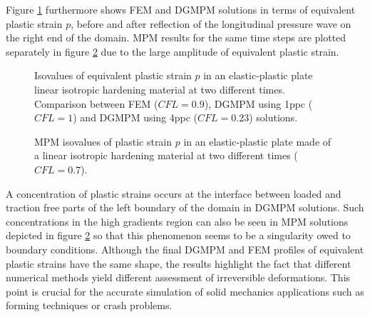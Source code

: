 Figure \ref{fig:2dEP_comparison} furthermore shows FEM and DGMPM solutions in terms of equivalent plastic strain $p$, before and after reflection of the longitudinal pressure wave on the right end of the domain.
MPM results for the same time steps are plotted separately in figure \ref{fig:2dEP_mpm} due to the large amplitude of equivalent plastic strain.
\begin{figure}[h!]
  \centering
  
  \caption{Isovalues of equivalent plastic strain $p$ in an elastic-plastic plate linear isotropic hardening material at two different times. Comparison between FEM ($CFL=0.9$), DGMPM using 1ppc ($CFL=1$) and DGMPM using 4ppc ($CFL=0.23$) solutions.}
  \label{fig:2dEP_comparison}
\end{figure}
\begin{figure}[h!]
  \centering
  
  \caption{MPM isovalues of plastic strain $p$ in an elastic-plastic plate made of a linear isotropic hardening material at two different times ($CFL=0.7$).}
  \label{fig:2dEP_mpm}
\end{figure}
A concentration of plastic strains occurs at the interface between loaded and traction free parts of the left boundary of the domain in DGMPM solutions. 
Such concentrations in the high gradients region can also be seen in MPM solutions depicted in figure \ref{fig:2dEP_mpm} so that this phenomenon seems to be a singularity owed to boundary conditions.
Although the final DGMPM and FEM profiles of equivalent plastic strains have the same shape, the results highlight the fact that different numerical methods yield different assessment of irreversible deformations.
This point is crucial for the accurate simulation of solid mechanics applications such as forming techniques or crash problems.




